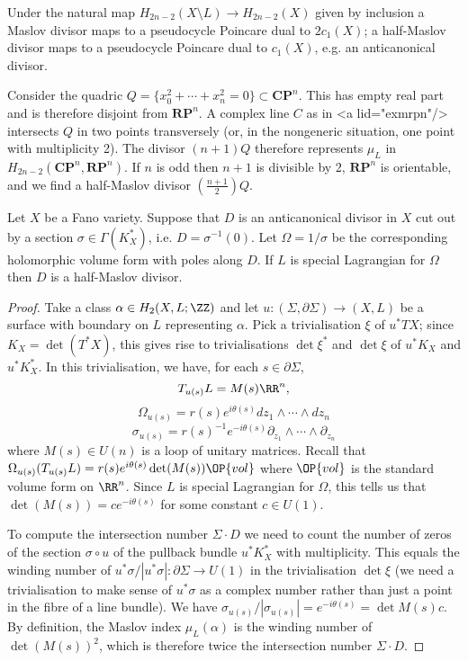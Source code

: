 \documentclass{article}
\begin{document}
\begin{Remark}
  Under the natural map $H_{2n-2}(X\setminus L)\to H_{2n-2}(X)$ given by inclusion a Maslov divisor maps to a pseudocycle Poincare dual to $2c_1(X)$; a half-Maslov divisor maps to a pseudocycle Poincare dual to $c_1(X)$, e.g. an anticanonical divisor.
\end{Remark}


\begin{Example}
Consider the quadric $Q=\{x_0^2+\cdots+x_n^2=0\}\subset\mathbf{CP}^n$. This has empty real part and is therefore disjoint from $\mathbf{RP}^n$. A complex line $C$ as in <a lid="exmrpn"/> intersects $Q$ in two points transversely (or, in the nongeneric situation, one point with multiplicity 2). The divisor $(n+1)Q$ therefore represents $\mu_L$ in $H_{2n-2}(\mathbf{CP}^n,\mathbf{RP}^n)$. If $n$ is odd then $n+1$ is divisible by 2, $\mathbf{RP}^n$ is orientable, and we find a half-Maslov divisor $\left(\frac{n+1}{2}\right)Q$.
\end{Example}

\begin{Lemma}
Let $X$ be a Fano variety. Suppose that $D$ is an anticanonical divisor in
$X$ cut out by a section $\sigma\in\Gamma(K^*_X)$, i.e. $D=\sigma^{-1}(0)$.
Let $\Omega=1/\sigma$ be the corresponding holomorphic volume form with
poles along $D$. If $L$ is special Lagrangian for $\Omega$ then $D$ is a
half-Maslov divisor.
\end{Lemma}
\begin{proof}
Take a class $\alpha\in H_2(X,L;\ZZ)$ and let
$u\colon(\Sigma,\partial\Sigma)\to (X,L)$ be a surface with boundary on $L$
representing $\alpha$. Pick a trivialisation $\xi$ of $u^*TX$; since
$K_X=\det(T^*X)$, this gives rise to trivialisations $\det\xi^*$ and
$\det\xi$ of $u^*K_X$ and $u^*K_X^*$. In this trivialisation, we have,
for each $s\in\partial\Sigma$,
\[T_{u(s)}L=M(s)\RR^n,\]
\[\Omega_{u(s)}=r(s)e^{i\theta(s)}dz_1\wedge\cdots\wedge dz_n\]
\[\sigma_{u(s)}=r(s)^{-1}e^{-i\theta(s)}\partial_{z_1}\wedge\cdots\wedge\partial_{z_n}\]
where $M(s)\in U(n)$ is a loop of unitary matrices. Recall that
$\Omega_{u(s)}(T_{u(s)}L)=r(s)e^{i\theta(s)}\det(M(s))\OP{vol}$ where
$\OP{vol}$ is the standard volume form on $\RR^n$. Since $L$ is special
Lagrangian for $\Omega$, this tells us that $\det(M(s))=ce^{-i\theta(s)}$
for some constant $c\in U(1)$.

To compute the intersection number $\Sigma\cdot D$ we need to count the
number of zeros of the section $\sigma\circ u$ of the pullback bundle
$u^*K^*_X$ with multiplicity. This equals the winding number of
$u^*\sigma/|u^*\sigma|\colon\partial\Sigma\to U(1)$ in the trivialisation
$\det\xi$ (we need a trivialisation to make sense of $u^*\sigma$ as a
complex number rather than just a point in the fibre of a line bundle). We
have $\sigma_{u(s)}/|\sigma_{u(s)}|=e^{-i\theta(s)}=\det M(s)c$. By
definition, the Maslov index $\mu_L(\alpha)$ is the winding number of
$\det(M(s))^2$, which is therefore twice the intersection number
$\Sigma\cdot D$.
\end{proof}
\end{document}

